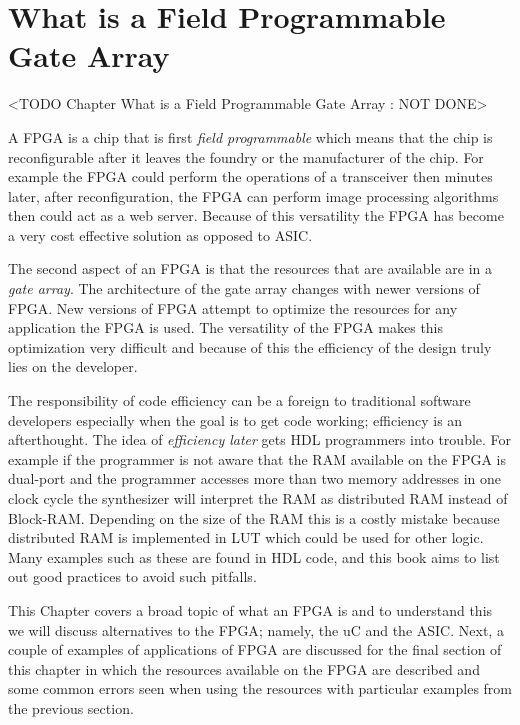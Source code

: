 \chapter{What is a Field Programmable Gate Array}
	<TODO Chapter What is a Field Programmable Gate Array : NOT DONE>

A \ac{FPGA} is a chip that is first \emph{field programmable} which means that the chip is reconfigurable after it leaves the foundry or the manufacturer of the chip. For example the \ac{FPGA} could perform the operations of a transceiver then minutes later, after reconfiguration, the \ac{FPGA} can perform image processing algorithms then could act as a web server. Because of this versatility the \ac{FPGA} has become a very cost effective solution as opposed to \ac{ASIC}.

The second aspect of an \ac{FPGA} is that the resources that are available are in a \emph{gate array}. The architecture of the gate array changes with newer versions of \ac{FPGA}. New versions of \ac{FPGA} attempt to optimize the resources for any application the \ac{FPGA} is used. The versatility of the \ac{FPGA} makes this optimization very difficult and because of this the efficiency of the design truly lies on the developer.

The responsibility of code efficiency can be a foreign to traditional software developers especially when the goal is to get code working; efficiency is an afterthought. The idea of \emph{efficiency later} gets \ac{HDL} programmers into trouble. For example if the programmer is not aware that the \ac{RAM} available on the \ac{FPGA} is dual-port and the programmer accesses more than two memory addresses in one clock cycle the synthesizer will interpret the \ac{RAM} as distributed \ac{RAM} instead of Block-\ac{RAM}. Depending on the size of the \ac{RAM} this is a costly mistake because distributed \ac{RAM} is implemented in \ac{LUT} which could be used for other logic. Many examples such as these are found in \ac{HDL} code, and this book aims to list out good practices to avoid such pitfalls.

This Chapter covers a broad topic of what an \ac{FPGA} is and to understand this we will discuss alternatives to the \ac{FPGA}; namely, the \ac{uC} and the \ac{ASIC}. Next, a couple of examples of applications of \ac{FPGA} are discussed for the final section of this chapter in which the resources available on the \ac{FPGA} are described and some common errors seen when using the resources with particular examples from the previous section. 

